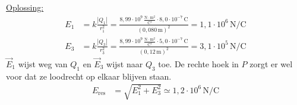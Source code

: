 \documentclass{ximera}
\begin{document}
\begin{exercise}
\begin{solution}
        \underline{Oplossing:}\\
        \begin{align*}
            E_{1} &= k \frac{|Q_{1}|}{r_{1}^{2}} = \frac{8{,}99 \cdot 10^{9} \, \mathrm{\frac{N \cdot m^2}{C^2}} \cdot 8{,}0 \cdot 10^{-7} \, \mathrm{C}}{(0{,}080 \, \mathrm{m})^{2}} = 1{,}1 \cdot 10^{6} \, \mathrm{N/C} \\
            E_{3} &= k \frac{|Q_{3}|}{r_{3}^{2}} = \frac{8{,}99 \cdot 10^{9} \, \mathrm{\frac{N \cdot m^2}{C^2}} \cdot 5{,}0 \cdot 10^{-7} \, \mathrm{C}}{(0{,}12 \, \mathrm{m})^{2}} = 3{,}1 \cdot 10^{5} \, \mathrm{N/C}
        \end{align*}
        $\vec{E}_1$ wijst weg van $Q_1$ en $\vec{E}_3$ wijst naar $Q_3$ toe. De rechte hoek in $P$ zorgt er wel voor dat ze loodrecht op elkaar blijven staan.
        \begin{align*}
            E_{\text{res}} &= \sqrt{E_1^{2} + E_3^{2}} \simeq \boxed{1{,}2 \cdot 10^{6} \, \mathrm{N/C}}
        \end{align*}
    \end{solution}
\end{exercise}
\end{document}

